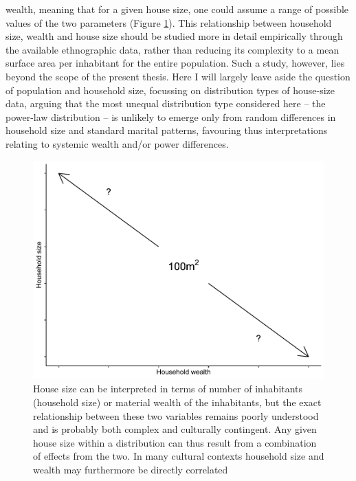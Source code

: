 \documentclass[
  12pt,
]{book}
\begin{document}
wealth, meaning that for a given house size, one could assume a range of possible values of the two parameters (Figure \ref{fig:04-intro}). This relationship between household size, wealth and house size should be studied more in detail empirically through the available ethnographic data, rather than reducing its complexity to a mean surface area per inhabitant for the entire population. Such a study, however, lies beyond the scope of the present thesis. Here I will largely leave aside the question of population and household size, focussing on distribution types of house-size data, arguing that the most unequal distribution type considered here -- the power-law distribution -- is unlikely to emerge only from random differences in household size and standard marital patterns, favouring thus interpretations relating to systemic wealth and/or power differences.



\begin{figure}

{\centering \includegraphics[width=0.9\linewidth]{bookdown-demo_files/figure-latex/04-intro-1} 

}

\caption{House size can be interpreted in terms of number of inhabitants (household size) or material wealth of the inhabitants, but the exact relationship between these two variables remains poorly understood and is probably both complex and culturally contingent. Any given house size within a distribution can thus result from a combination of effects from the two. In many cultural contexts household size and wealth may furthermore be directly correlated}\label{fig:04-intro}
\end{figure}
\end{document}
